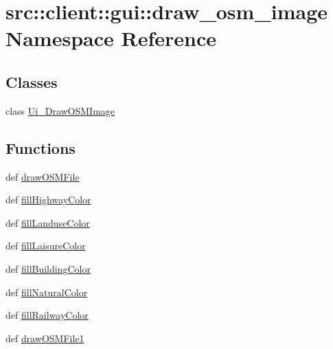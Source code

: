 \hypertarget{namespacesrc_1_1client_1_1gui_1_1draw__osm__image}{
\section{src::client::gui::draw\_\-osm\_\-image Namespace Reference}
\label{namespacesrc_1_1client_1_1gui_1_1draw__osm__image}
}
\subsection*{Classes}
\begin{DoxyCompactItemize}
\item 
class \hyperlink{classsrc_1_1client_1_1gui_1_1draw__osm__image_1_1Ui__DrawOSMImage}{Ui\_\-DrawOSMImage}
\end{DoxyCompactItemize}
\subsection*{Functions}
\begin{DoxyCompactItemize}
\item 
def \hyperlink{namespacesrc_1_1client_1_1gui_1_1draw__osm__image_ad1556ec41484df3657354576a4bfadee}{drawOSMFile}
\item 
def \hyperlink{namespacesrc_1_1client_1_1gui_1_1draw__osm__image_a03f4f8efb5717cc9991c30c43cca88aa}{fillHighwayColor}
\item 
def \hyperlink{namespacesrc_1_1client_1_1gui_1_1draw__osm__image_a007aa2a3bd992ff47df638d2b152c8d1}{fillLanduseColor}
\item 
def \hyperlink{namespacesrc_1_1client_1_1gui_1_1draw__osm__image_aa8b01a59a1def18c55385f2e70cc2053}{fillLaisureColor}
\item 
def \hyperlink{namespacesrc_1_1client_1_1gui_1_1draw__osm__image_a1540bc91a7973efd5d2f744ff8e93146}{fillBuildingColor}
\item 
def \hyperlink{namespacesrc_1_1client_1_1gui_1_1draw__osm__image_a273324065e46f166a37514bee78784cf}{fillNaturalColor}
\item 
def \hyperlink{namespacesrc_1_1client_1_1gui_1_1draw__osm__image_a1e1d997267928524a9aaafed1e2a0c5d}{fillRailwayColor}
\item 
def \hyperlink{namespacesrc_1_1client_1_1gui_1_1draw__osm__image_adc97185c793e8fae765cf4baef03105d}{drawOSMFile1}
\end{DoxyCompactItemize}
